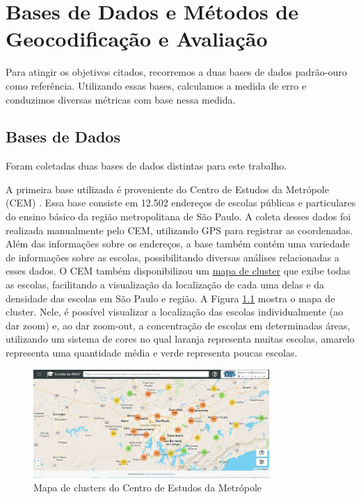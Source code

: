 \chapter{Bases de Dados e Métodos de Geocodificação e Avaliação} \label{desenvolvimento}

Para atingir os objetivos citados, recorremos a duas bases de dados padrão-ouro como referência. Utilizando essas bases, calculamos a medida de erro e conduzimos diversas métricas com base nessa medida.

\section{Bases de Dados}

Foram coletadas duas bases de dados distintas para este trabalho.

A primeira base utilizada é proveniente do Centro de Estudos da Metrópole (CEM) \cite{cem}. Essa base consiste em 12.502 endereços de escolas públicas e particulares do ensino básico da região metropolitana de São Paulo. A coleta desses dados foi realizada manualmente pelo CEM, utilizando GPS para registrar as coordenadas. Além das informações sobre os endereços, a base também contém uma variedade de informações sobre as escolas, possibilitando diversas análises relacionadas a esses dados. O CEM também disponibilizou um \href{http://200.144.244.241:3002/geolocation}{mapa de cluster} que exibe todas as escolas, facilitando a visualização da localização de cada uma delas e da densidade das escolas em São Paulo e região. A Figura \ref{fig:siteCEM} mostra o mapa de cluster. Nele, é possível visualizar a localização das escolas individualmente (ao dar zoom) e, ao dar zoom-out, a concentração de escolas em determinadas áreas, utilizando um sistema de cores no qual laranja representa muitas escolas, amarelo representa uma quantidade média e verde representa poucas escolas. 

\begin{figure} 
    \centering
    \includegraphics[width=0.8\textwidth]{Figuras/siteCEM.jpeg}
    \caption{Mapa de clusters do Centro de Estudos da Metrópole}
    \label{fig:siteCEM}
\end{figure} 

